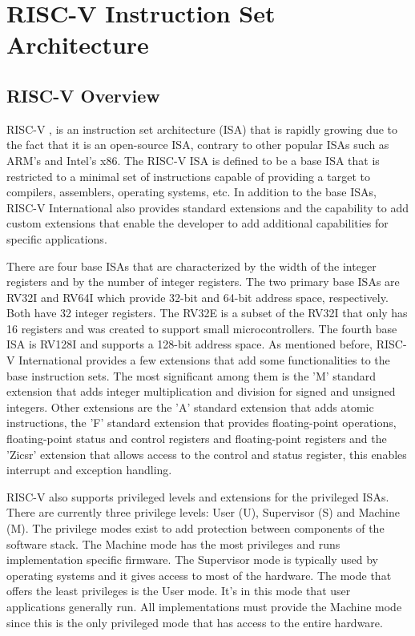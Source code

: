 \chapter{RISC-V Instruction Set Architecture}
\label{chapter:RISC-V}
\section{RISC-V Overview}
RISC-V \cite{RISCV_manual_1}, \cite{RISCV_manual_2} is an instruction set architecture (ISA) that is rapidly growing due to the fact that it is an open-source ISA, contrary to other popular ISAs such as ARM's and Intel's x86. The RISC-V ISA is defined to be a base ISA that is restricted to a minimal set of instructions capable of providing a target to compilers, assemblers, operating systems, etc. In addition to the base ISAs, RISC-V International \cite{RISCV_International} also provides standard extensions and the capability to add custom extensions that enable the developer to add additional capabilities for specific applications.

There are four base ISAs that are characterized by the width of the integer registers and by the number of integer registers. The two primary base ISAs are RV32I and RV64I which provide 32-bit and 64-bit address space, respectively. Both have 32 integer registers. The RV32E is a subset of the RV32I that only has 16 registers and was created to support small microcontrollers. The fourth base ISA is RV128I and supports a 128-bit address space. As mentioned before, RISC-V International provides a few extensions that add some functionalities to the base instruction sets. The most significant among them is the 'M' standard extension that adds integer multiplication and division for signed and unsigned integers. Other extensions are the 'A' standard extension that adds atomic instructions, the 'F' standard extension that provides floating-point operations, floating-point status and control registers and floating-point registers and the 'Zicsr' extension that allows access to the control and status register, this enables interrupt and exception handling.

RISC-V also supports privileged levels and extensions for the privileged ISAs. There are currently three privilege levels: User (U), Supervisor (S) and Machine (M). The privilege modes exist to add protection between components of the software stack. The Machine mode has the most privileges and runs implementation specific firmware. The Supervisor mode is typically used by operating systems and it gives access to most of the hardware. The mode that offers the least privileges is the User mode. It's in this mode that user applications generally run. All implementations must provide the Machine mode since this is the only privileged mode that has access to the entire hardware.

